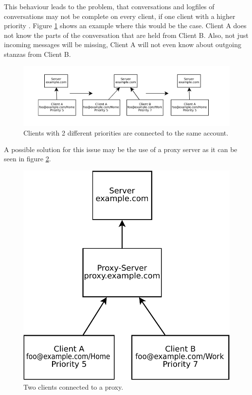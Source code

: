 \documentclass[a4paper,10pt,numbers=noendperiod]{scrartcl}
\begin{document}
This behaviour leads to the problem, that conversations and logfiles of conversations may not be complete on every client, if one client with a higher priority . Figure \ref{fig:2clients} shows an example where this would be the case. Client A does not know the parts of the conversation that are held from Client B. Also, not just incoming messages will be missing, Client A will not even know about outgoing stanzas from Client B. 
\begin{figure}[h!]
	\begin{center}
		\includegraphics[scale=0.6]{figures/diagram1.pdf}
	\end{center}
	\caption{Clients with 2 different priorities are connected to the same account.}
	\label{fig:2clients}
\end{figure}


A possible solution for this issue may be the use of a proxy server as it can be seen in figure \ref{fig:2clientsproxy}.

\begin{figure}[h!]
	\begin{center}
		\includegraphics[scale=0.5]{figures/diagram3.pdf}
	\end{center}
	\caption{Two clients connected to a proxy.}
	\label{fig:2clientsproxy}
\end{figure}
\end{document}
